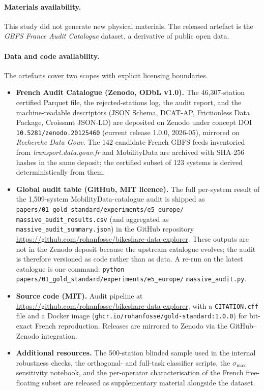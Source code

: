 \documentclass[11pt,a4paper]{article}
\begin{document}
\paragraph{Materials availability.} This study did not generate new
physical materials. The released artefact is the
\emph{GBFS France Audit Catalogue} dataset, a derivative of public open
data.

\paragraph{Data and code availability.}
The artefacts cover two scopes with explicit licensing boundaries.
\begin{itemize}[leftmargin=*]
\item \textbf{French Audit Catalogue (Zenodo, ODbL v1.0).} The
46{,}307-station certified Parquet file, the rejected-stations
log, the audit report, and the machine-readable descriptors (JSON
Schema, DCAT-AP, Frictionless Data Package, Croissant JSON-LD) are
deposited on Zenodo under concept DOI
\texttt{10.5281/zenodo.20125460} (current release 1.0.0,
2026-05), mirrored on \emph{Recherche Data Gouv}. The 142 candidate
French GBFS feeds inventoried from \emph{transport.data.gouv.fr}
and MobilityData are archived with SHA-256 hashes in the same
deposit; the certified subset of 123 systems is derived
deterministically from them.
\item \textbf{Global audit table (GitHub, MIT licence).} The full
per-system result of the 1{,}509-system MobilityData-catalogue audit
is shipped as \texttt{papers/01\_gold\_standard/experiments/e5\_europe/}\linebreak
\texttt{massive\_audit\_results.csv} (and aggregated as
\texttt{massive\_audit\_summary.json}) in the GitHub repository
\url{https://github.com/rohanfosse/bikeshare-data-explorer}. These
outputs are not in the Zenodo deposit because the upstream
catalogue evolves; the audit is therefore versioned as code rather
than as data. A re-run on the latest catalogue is one command:
\texttt{python papers/01\_gold\_standard/experiments/e5\_europe/}\linebreak
\texttt{massive\_audit.py}.
\item \textbf{Source code (MIT).} Audit pipeline at
\url{https://github.com/rohanfosse/bikeshare-data-explorer}, with a
\texttt{CITATION.cff} file and a Docker image
(\texttt{ghcr.io/rohanfosse/gold-standard:1.0.0}) for bit-exact
French reproduction. Releases are mirrored to Zenodo via the
GitHub--Zenodo integration.
\item \textbf{Additional resources.} The 500-station blinded sample
used in the internal robustness checks, the orthogonal- and full-task
classifier scripts, the $\sigma_{\max}$ sensitivity notebook, and the
per-operator characterisation of the French free-floating subset
are released as supplementary material alongside the dataset.
\end{itemize}
\end{document}
